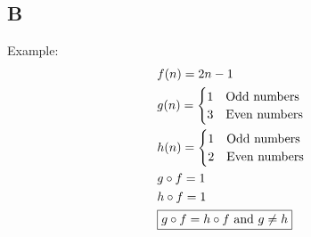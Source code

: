 \documentclass[12pt, oneside]{article}
\begin{document}
\subsection{B}
Example:
\begin{eqnarray*}
& f(n) = 2n - 1\\
& g(n) = 
	\begin{cases}
	1& \text{Odd numbers}\\
	3& \text{Even numbers}\\
	\end{cases}\\
& h(n) = 
	\begin{cases}
	1& \text{Odd numbers}\\
	2& \text{Even numbers}\\
	\end{cases}\\
& g \circ f = 1\\
& h \circ f = 1\\
& \framebox{$g \circ f = h \circ f$ and $g \neq h$}
\end{eqnarray*}
\end{document}
